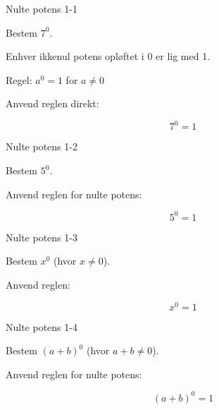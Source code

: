 \documentclass{article}
\begin{document}

\tableofcontents
\newpage

\begin{exercise}{Nulte potens 1-1}

Bestem $7^0$.


\hint

Enhver ikkenul potens opløftet i 0 er lig med 1.

\hint

Regel: $a^0 = 1$ for $a \neq 0$

\hint

Anvend reglen direkt:

\hint
\[
7^0 = 1
\]

\end{exercise}

\newpage

\begin{exercise}{Nulte potens 1-2}

Bestem $5^0$.


\hint

Anvend reglen for nulte potens:

\hint
\[
5^0 = 1
\]

\end{exercise}

\newpage

\begin{exercise}{Nulte potens 1-3}

Bestem $x^0$ (hvor $x \neq 0$).


\hint

Anvend reglen:

\hint
\[
x^0 = 1\]

\end{exercise}

\newpage

\begin{exercise}{Nulte potens 1-4}

Bestem $(a + b)^0$ (hvor $a + b \neq 0$).


\hint

Anvend reglen for nulte potens:

\hint
\[
(a + b)^0 = 1\]

\end{exercise}

\newpage
\end{document}
